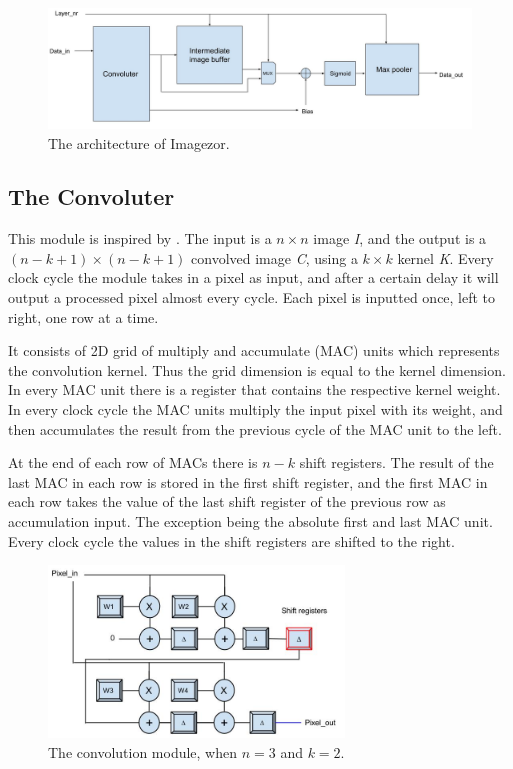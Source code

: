 \begin{figure}[h!]
  \centering
      \includegraphics[width=1.0\textwidth]{Figures/Method/conv_layer_arch}
  \caption{The architecture of Imagezor.}
\end{figure}


\subsection{The Convoluter} 

This module is inspired by \cite{Farabet2009}. The input is a $ n \times n $ image \textit{I}, and the output is a $ (n-k+1) \times (n-k+1) $ convolved image \textit{C}, using a $ k \times k $ kernel \textit{K}. Every clock cycle the module takes in a pixel as input, and after a certain delay it will output a processed pixel almost every cycle. Each pixel is inputted once, left to right, one row at a time. 

It consists of 2D grid of multiply and accumulate (MAC) units which represents the convolution kernel. Thus the grid dimension is equal to the kernel dimension. In every MAC unit there is a register that contains the respective kernel weight. In every clock cycle the MAC units multiply the input pixel with its weight, and then accumulates the result from the previous cycle of the MAC unit to the left. 

At the end of each row of MACs there is $ n - k $ shift registers. The result of the last MAC in each row is stored in the first shift register, and the first MAC in each row takes the value of the last shift register of the previous row as accumulation input. The exception being the absolute first and last MAC unit. Every clock cycle the values in the shift registers are shifted to the right. 

\begin{figure}[h!]
  \centering
      \includegraphics[width=0.7\textwidth]{Figures/Method/Convolver}
  \caption{The convolution module, when $ n = 3 $ and $ k = 2 $.}
\end{figure}
	
